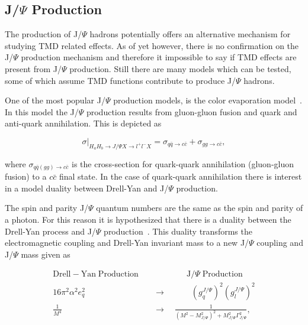 \subsection{J/$\Psi$ Production}\label{sec::theory_jpsi}
The production of J/$\Psi$ hadrons potentially offers an alternative mechanism
for studying TMD related effects.  As of yet however, there is no confirmation
on the J/$\Psi$ production mechanism and therefore it impossible to say if TMD
effects are present from J/$\Psi$ production.  Still there are many models which
can be tested, some of which assume TMD functions contribute to produce J/$\Psi$
hadrons.

One of the most popular J/$\Psi$ production models, is the color evaporation
model~\cite{VOGT1999197}.  In this model the J/$\Psi$ production results from
gluon-gluon fusion and quark and anti-quark annihilation.  This is depicted as

\begin{equation}
  \sigma \Big |_{H_aH_b\rightarrow J/\Psi X \rightarrow l^+l^- X}
  = \sigma_{q\bar{q}\rightarrow c\bar{c}} + \sigma_{gg\rightarrow c\bar{c}},
\end{equation}

\noindent
where $\sigma_{q\bar{q}(gg)\rightarrow c\bar{c}}$ is the cross-section for
quark-quark annihilation (gluon-gluon fusion) to a $c\bar{c}$ final state.  In
the case of quark-quark annihilation there is interest in a model duality
between Drell-Yan and J/$\Psi$ production.

The spin and parity J/$\Psi$ quantum numbers are the same as the spin and parity
of a photon.  For this reason it is hypothesized that there is a duality between
the Drell-Yan process and J/$\Psi$
production~\cite{Anselmino:2004ki,Barone2007,Sissakian:2008th}.  This duality
transforms the electromagnetic coupling and Drell-Yan invariant mass to a new
J/$\Psi$ coupling and J/$\Psi$ mass given as

\begin{align}
  \nonumber
  \mathrm{Drell-}\mathrm{Yan}\; \mathrm{Production} \quad &
  \quad\quad\quad\quad \mathrm{J/}\Psi \;\mathrm{Production}
  \\
  \label{equ::dualityJPsi_coupling}
  16\pi^2\alpha^2e_q^2 \quad &\rightarrow
  \quad \quad\quad (g_q^{J/\Psi})^2(g_l^{J/\Psi})^2
  \\
  \label{equ::dualityJPsi_mass}
  \frac{1}{M^4} \quad \quad &\rightarrow \quad
  \frac{1}{(M^2-M^2_{J/\Psi})^2 + M^2_{J/\Psi}\Gamma^2_{J/\Psi}},
\end{align}


